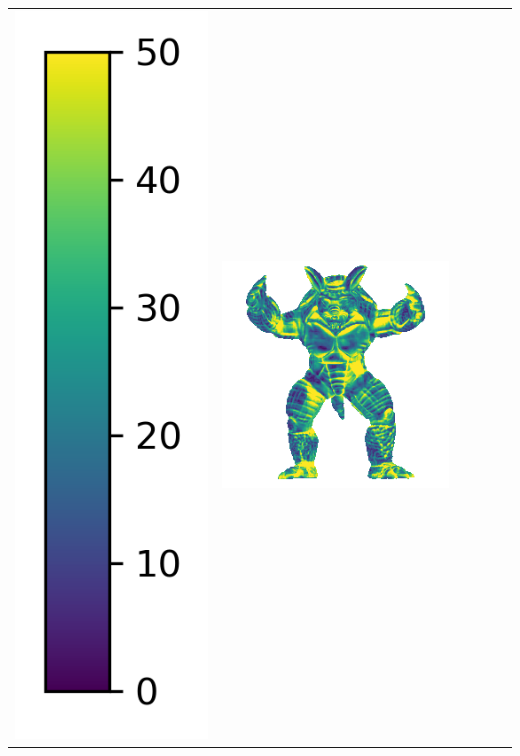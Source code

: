 \begin{center}
\begin{tabularx}{\linewidth}{@{}Y@{}Y@{}Y@{}Y@{}Y@{}Y@{}}
\includegraphics[width=0.2\linewidth]{semisynthetic/colorbar_error_vertical.png} &
\includegraphics[width=\linewidth]{semisynthetic/20160617_22_ours_err.png} &

\end{tabularx}
\end{center}
